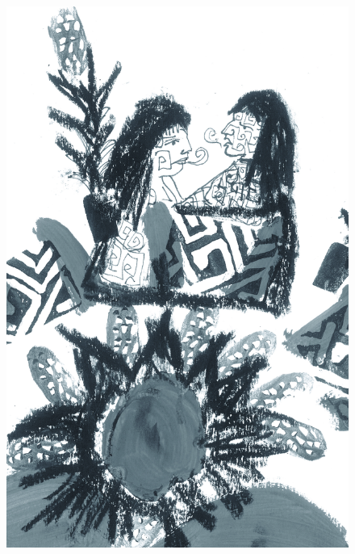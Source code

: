 \pagebreak
\thispagestyle{empty}
\begin{figure}
\vspace*{-1.6cm}
\hspace*{-2.2cm}\includegraphics[width=138mm]{./imgs/img5.jpg}
\end{figure}

\chapter*{}


